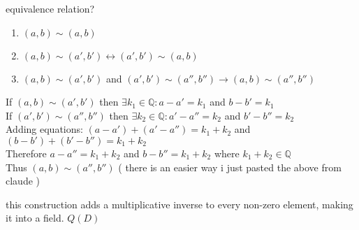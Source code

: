 \documentclass{article}
\begin{document}
equivalence relation? 
\begin{enumerate}
    \item $(a,b) \sim (a,b) $ 
    \item $(a,b) \sim (a', b') \leftrightarrow (a', b') \sim (a,b)$ 
    \item $(a,b) \sim (a', b') $ and $(a',b') \sim (a'', b'') \rightarrow (a,b) \sim (a'', b'')$
\end{enumerate}
If $(a,b) \sim (a',b')$ then $\exists k_1 \in \mathbb{Q}: a-a'=k_1$ and $b-b'=k_1$ \\
If $(a',b') \sim (a'',b'')$ then $\exists k_2 \in \mathbb{Q}: a'-a''=k_2$ and $b'-b''=k_2$ \\
Adding equations: $(a-a')+(a'-a'')=k_1+k_2$ and $(b-b')+(b'-b'')=k_1+k_2$ \\
Therefore $a-a''=k_1+k_2$ and $b-b''=k_1+k_2$ where $k_1+k_2 \in \mathbb{Q}$ \\
Thus $(a,b) \sim (a'',b'')$ 
( there is an easier way i just pasted the above from claude )

 
this construction adds a multiplicative inverse to every non-zero element, making it into a field. $Q(D)$
\end{document}
